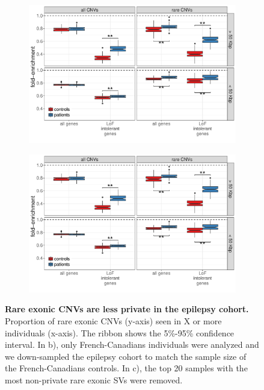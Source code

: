 \begin{figure}[htp]
  \begin{subfigure}[b]{.49\textwidth}
    \includegraphics[width=\linewidth,page=5]{figures/epilepsy-enrichmentPatterns.pdf}
    \caption{}
    \label{fig:epiexpriv2}
  \end{subfigure}
  \begin{subfigure}[b]{.49\textwidth}
    \includegraphics[width=\linewidth,page=4]{figures/epilepsy-enrichmentPatterns.pdf}
    \caption{}
  \end{subfigure}
  \caption[Rare exonic CNVs are less private in the epilepsy cohort.]{{\bf Rare exonic CNVs are less private in the epilepsy cohort.} {\small Proportion of rare exonic CNVs (y-axis) seen in X or more individuals (x-axis). The ribbon shows the 5\%-95\% confidence interval. In b), only French-Canadians individuals were analyzed and we down-sampled the epilepsy cohort to match the sample size of the French-Canadians controls. In c), the top 20 samples with the most non-private rare exonic SVs were removed. }}
\end{figure}


